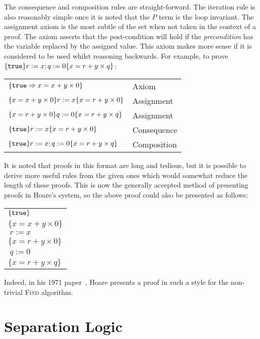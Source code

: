 \documentclass[a4paper,notitlepage]{report}
\begin{document}
  The consequence and composition rules are straight-forward. The iteration rule
  is also reasonably simple once it is noted that the $P$ term is the loop
  invariant. The assignment axiom is the most subtle of the set when not taken
  in the context of a proof. The axiom asserts that the post-condition will hold
  if the \emph{precondition} has the variable replaced by
  the assigned value. This axiom makes more sense if it is considered to be used
  whilst reasoning backwards. For example, to prove $\{\texttt{true}\}r := x; q :=
  0\{x = r + y \times q\}$:

  \begin{tabular}{ll}
    $\{\texttt{true} \Rightarrow x = x + y \times 0 \}$ & Axiom \\
    $\{x = x + y \times 0\}r:=x\{x = r + y \times 0\}$ & Assignment \\
    $\{x = r + y \times 0\}q:=0\{x = r + y \times q\}$ & Assignment \\
    $\{\texttt{true}\}r:=x\{x = r + y \times 0\}$ & Consequence \\
    $\{\texttt{true}\}r:=x; q:=0\{x = r + y \times q\}$ & Composition\\
  \end{tabular}

  It is noted that proofs in this format are long and tedious, but it is
  possible to derive more useful rules from the given ones which would somewhat
  reduce the length of these proofs. This is now the generally accepted method
  of presenting proofs in Hoare's system, so the above proof could also be
  presented as follows:

  \begin{tabular}{l}
    $\{\texttt{true}\}$ \\
    $\{x = x + y \times 0\}$ \\
    $\ r:=x$ \\
    $\{x = r + y \times 0\}$ \\
    $\ q:=0$ \\
    $\{x = r + y \times q\}$
  \end{tabular}

  Indeed, in his 1971 paper~\cite{Hoare1971proof}, Hoare presents a proof in
  such a style for the non-trivial \textsc{Find} algorithm.


\section{Separation Logic}
\end{document}
